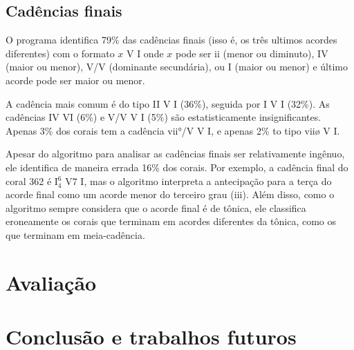 \documentclass{article}
\begin{document}
\subsection{Cadências finais}
\label{sec:cadencias}

O programa identifica 79\% das cadências finais (isso é, os três
ultimos acordes diferentes) com o formato $x$ V I onde $x$ pode ser ii
(menor ou diminuto), IV (maior ou menor), V/V (dominante secundária),
ou I (maior ou menor) e último acorde pode ser maior ou menor.

A cadência mais comum é do tipo II V I (36\%), seguida por I V I
(32\%). As cadências IV VI (6\%) e V/V V I (5\%) são estatisticamente
insignificantes. Apenas 3\% dos corais tem a cadência vii°/V V I, e
apenas 2\% to tipo viiø V I.

Apesar do algoritmo para analisar as cadências finais ser
relativamente ingênuo, ele identifica de maneira errada 16\% dos
corais. Por exemplo, a cadência final do coral 362 é I$^6_4$ V7 I, mas
o algoritmo interpreta a antecipação para a terça do acorde final como
um acorde menor do terceiro grau (iii). Além disso, como o algoritmo
sempre considera que o acorde final é de tônica, ele classifica
eroneamente os corais que terminam em acordes diferentes da tônica,
como os que terminam em meia-cadência.

\section{Avaliação}
\label{sec:avaliacao}

\section{Conclusão e trabalhos futuros}
\label{sec:concl-e-trab}

\renewcommand{\refname}{Referências Bibliográficas}


\end{document}
